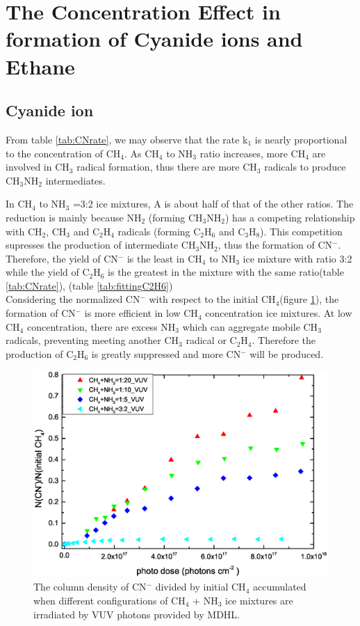 \section{The Concentration Effect in formation of Cyanide ions and Ethane}

\subsection{Cyanide ion}

From table \ref{tab:CNrate}, we may observe that the rate k$_1$ is nearly proportional to the concentration of CH$_4$.  As CH$_4$ to NH$_3$ ratio increases, more CH$_4$ are involved in CH$_3$ radical formation, thus there are more CH$_3$ radicals to produce CH$_3$NH$_2$ intermediates.

In CH$_4$ to NH$_3$ =3:2 ice mixtures, A is about half of that of the other ratios. The reduction is mainly because NH$_2$ (forming CH$_3$NH$_2$) has a competing relationship with CH$_2$, CH$_3$ and C$_2$H$_4$ radicals (forming C$_2$H$_6$ and C$_3$H$_8$). This competition supresses the production of intermediate CH$_3$NH$_2$, thus the formation of CN$^-$. Therefore, the yield of CN$^-$ is the least in CH$_4$ to NH$_3$ ice mixture with ratio 3:2 while the yield of C$_2$H$_6$ is the greatest in the mixture with the same ratio(table \ref{tab:CNrate}), (table \ref{tab:fittingC2H6})\\

Considering the normalized CN$^-$ with respect to the initial CH$_4$(figure \ref{fig:CN_CH4}), the formation of CN$^-$ is more efficient in low CH$_4$ concentration ice mixtures. At low CH$_4$ concentration, there are excess NH$_3$ which can aggregate mobile CH$_3$ radicals, preventing meeting another CH$_3$ radical or C$_2$H$_4$. Therefore the production of C$_2$H$_6$ is greatly suppressed and more CN$^-$ will be produced.

\begin{figure}
\centering
\includegraphics[width=\textwidth]{figures/chapter3/CN_CH4.eps}
\caption{The column density of CN$^-$ divided by initial CH$_4$ accumulated when different configurations of CH$_4$ + NH$_3$ ice mixtures are irradiated by VUV photons provided by MDHL.}
\label{fig:CN_CH4}
\end{figure}


